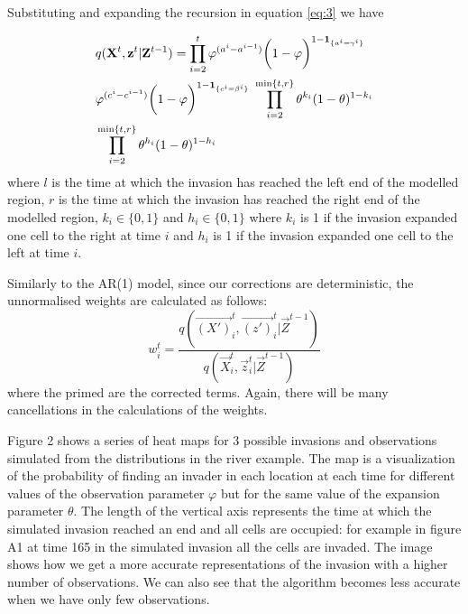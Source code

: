 Substituting and expanding the recursion in equation \eqref{eq:3} we have

\begin{align}
    & q(\mathbf{X}^{t},\mathbf{z}^{t} | \mathbf{Z}^{t-1}) =  \prod_{i=2}^{t} \varphi^{(a^{i} - a^{i-1})}\bigg(1 - \varphi \bigg)^{1-\mathbf{1}_{\{a^i=\gamma^i\}}} \nonumber \\
    & \varphi^{(c^{i} - c^{i-1})} \bigg(1 - \varphi\bigg)^{1-\mathbf{1}_{\{c^i=\beta^i\}}} \; \prod_{i=2}^{\min\{t,r\}} \theta^{k_i} (1-\theta)^{1-k_i}  \label{eq:4} \\ 
    & \prod_{i=2}^{\min\{t,r\}} \theta^{h_i} (1-\theta)^{1-h_i} \nonumber
\end{align}
where $l$ is the time at which the invasion has reached the left end of the modelled region, $r$ is the time at which the invasion has reached the right end of the modelled region, {\color{blue} $k_i \in \{0,1\}$ and $h_i \in \{0,1\}$ where $k_i$ is 1 if the invasion expanded one cell to the right at time $i$ and $h_i$ is 1 if the invasion expanded one cell to the left at time $i$}.

Similarly to the AR(1) model, since our corrections are deterministic, the unnormalised weights are calculated as follows:
\begin{equation*}
    w^{t}_i = \frac{q(\vec{(X')}^{t}_i,\vec{(z')}^{t}_i | \vec{Z}^{t-1})}{q(\vec{X}^{t}_i,\vec{z}^{t}_i | \vec{Z}^{t-1})}
\end{equation*}
where the primed are the corrected terms. Again, there will be many cancellations in the calculations of the weights.

Figure 2 shows a series of heat maps for 3 possible invasions and observations simulated from the distributions in the river example. The map is a visualization of the probability of finding an invader in each location at each time for different values of the observation parameter $\varphi$ but for the same value of the expansion  parameter $\theta$. The length of the vertical axis represents the time at which the simulated invasion reached an end and all cells are occupied: for example in figure A1 at time 165 in the simulated invasion all the cells are invaded. The image shows how we get a more accurate representations of the invasion with a higher number of observations. We can also see that the algorithm becomes less accurate when we have only few observations.

